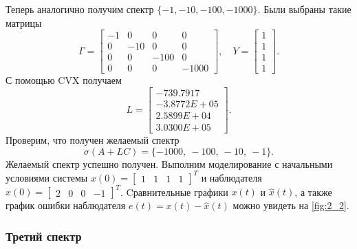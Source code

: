 Теперь аналогично получим спектр $\{-1, -10, -100, -1000\}$.
Были выбраны такие матрицы
\begin{equation*}
    \Gamma=\begin{bmatrix}
        -1&  0&  0&  0\\
        0& -10&  0&  0\\
        0&  0& -100&  0\\
        0&  0&  0& -1000
    \end{bmatrix},\quad
    Y=\begin{bmatrix}
        1\\ 1\\ 1\\ 1
    \end{bmatrix}.
\end{equation*} 
С помощью CVX получаем
\begin{equation*}
    L=\begin{bmatrix}
        -739.7917\\
        -3.8772E+05\\
        2.5899E+04\\
        3.0300E+05
    \end{bmatrix}.
\end{equation*}
Проверим, что получен желаемый спектр
\begin{equation*}
    \sigma(A+LC)=\{-1000,\ -100,\ -10,\ -1\}.
\end{equation*}
Желаемый спектр успешно получен.
Выполним моделирование с начальными условиями системы 
$x(0) = \begin{bmatrix}
    1 & 1 & 1 & 1
\end{bmatrix}^T$ и наблюдателя $\hat x(0) = \begin{bmatrix}
    2 & 0 & 0 & -1
\end{bmatrix}^T$. Cравнительные графики $x(t)$ и $\hat x(t)$, 
а также график ошибки наблюдателя $e(t) = x(t) -\hat x(t)$
можно увидеть на \autoref{fig:2_2}.


\subsubsection{Третий спектр}

